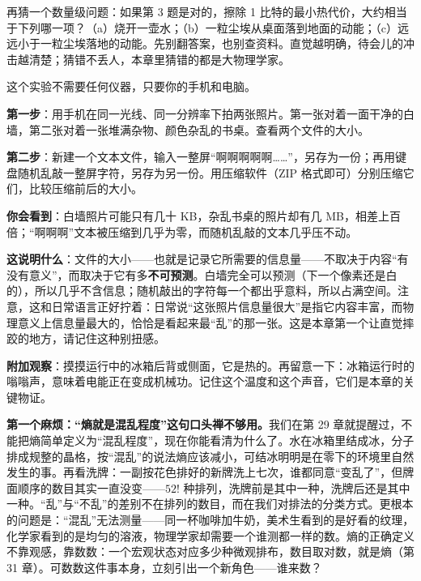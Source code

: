 再猜一个数量级问题：如果第 3 题是对的，擦除 1 比特的最小热代价，大约相当于下列哪一项？（a）烧开一壶水；（b）一粒尘埃从桌面落到地面的动能；（c）远远小于一粒尘埃落地的动能。先别翻答案，也别查资料。直觉越明确，待会儿的冲击越清楚；猜错不丢人，本章里猜错的都是大物理学家。


\begin{experiment}[两张照片与两段文字]
这个实验不需要任何仪器，只要你的手机和电脑。

\textbf{第一步}：用手机在同一光线、同一分辨率下拍两张照片。第一张对着一面干净的白墙，第二张对着一张堆满杂物、颜色杂乱的书桌。查看两个文件的大小。

\textbf{第二步}：新建一个文本文件，输入一整屏“啊啊啊啊啊……”，另存为一份；再用键盘随机乱敲一整屏字符，另存为另一份。用压缩软件（ZIP 格式即可）分别压缩它们，比较压缩前后的大小。

\textbf{你会看到}：白墙照片可能只有几十 KB，杂乱书桌的照片却有几 MB，相差上百倍；“啊啊啊”文本被压缩到几乎为零，而随机乱敲的文本几乎压不动。

\textbf{这说明什么}：文件的大小——也就是记录它所需要的信息量——不取决于内容“有没有意义”，而取决于它有多\textbf{不可预测}。白墙完全可以预测（下一个像素还是白的），所以几乎不含信息；随机敲出的字符每一个都出乎意料，所以占满空间。注意，这和日常语言正好拧着：日常说“这张照片信息量很大”是指它内容丰富，而物理意义上信息量最大的，恰恰是看起来最“乱”的那一张。这是本章第一个让直觉摔跤的地方，请记住这种别扭感。

\textbf{附加观察}：摸摸运行中的冰箱后背或侧面，它是热的。再留意一下：冰箱运行时的嗡嗡声，意味着电能正在变成机械功。记住这个温度和这个声音，它们是本章的关键物证。
\end{experiment}


\textbf{第一个麻烦：“熵就是混乱程度”这句口头禅不够用。}我们在第 29 章就提醒过，不能把熵简单定义为“混乱程度”，现在你能看清为什么了。水在冰箱里结成冰，分子排成规整的晶格，按“混乱”的说法熵应该减小，可结冰明明是在零下的环境里自然发生的事。再看洗牌：一副按花色排好的新牌洗上七次，谁都同意“变乱了”，但牌面顺序的数目其实一直没变——$52!$ 种排列，洗牌前是其中一种，洗牌后还是其中一种。“乱”与“不乱”的差别不在排列的数目，而在我们对排法的分类方式。更根本的问题是：“混乱”无法测量——同一杯咖啡加牛奶，美术生看到的是好看的纹理，化学家看到的是均匀的溶液，物理学家却需要一个谁测都一样的数。熵的正确定义不靠观感，靠数数：一个宏观状态对应多少种微观排布，数目取对数，就是熵（第 31 章）。可数数这件事本身，立刻引出一个新角色——谁来数？

